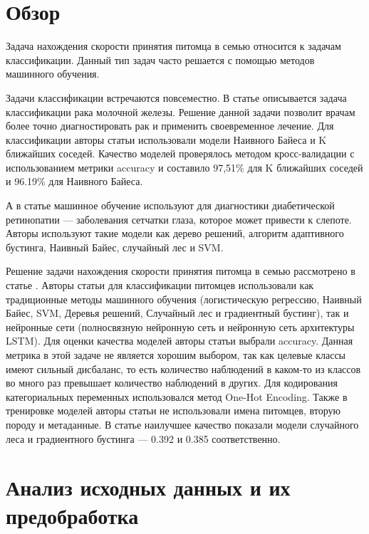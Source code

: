 \documentclass[14pt]{mmcs_article}
\begin{document}
\newpage
{}
\section*{Обзор}

Задача нахождения скорости принятия питомца в семью относится к задачам классификации. Данный тип задач часто решается с помощью методов машинного обучения. 
 
Задачи классификации встречаются повсеместно. В статье \cite{lib:obz1} описывается задача классификации рака молочной железы. Решение данной задачи позволит врачам более точно диагностировать рак и применить своевременное лечение. Для классификации авторы статьи использовали модели Наивного Байеса и K ближайших соседей. Качество моделей проверялось методом кросс-валидации с использованием метрики accuracy и составило 97,51\% для K ближайших соседей и 96.19\% для Наивного Байеса.

А в статье \cite{lib:obz2} машинное обучение используют для диагностики диабетической ретинопатии — заболевания сетчатки глаза, которое может привести к слепоте. Авторы используют такие модели как дерево решений, алгоритм адаптивного бустинга, Наивный Байес, случайный лес и SVM.

Решение задачи нахождения скорости принятия питомца в семью рассмотрено в статье \cite{lib:obz3}. Авторы статьи для классификации питомцев использовали как традиционные методы машинного обучения (логистическую регрессию, Наивный Байес, SVM, Деревья решений, Случайный лес и градиентный бустинг), так и нейронные сети (полносвязную нейронную сеть и нейронную сеть архитектуры LSTM). Для оценки качества моделей авторы статьи выбрали accuracy. Данная метрика в этой задаче не является хорошим выбором, так как целевые классы имеют сильный дисбаланс, то есть количество наблюдений в каком-то из классов во много раз превышает количество наблюдений в других. Для кодирования категориальных переменных использовался метод One-Hot Encoding. Также в тренировке моделей авторы статьи не использовали имена питомцев, вторую породу и метаданные. В статье наилучшее качество показали модели случайного леса и градиентного бустинга — 0.392 и 0.385 соответственно.


\newpage
\section{Анализ исходных данных и их предобработка}
\end{document}
